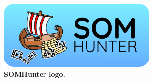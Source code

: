 \begin{figure}[b]
	\centering
	\includegraphics[width=0.7\textwidth]{img/somhunter-logo.png}
  \caption{\textbf{SOMHunter logo.}}
	\label{fig:logo}
\end{figure}
